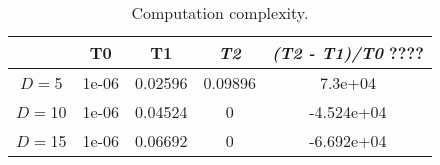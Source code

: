 \begin{table}[ht]
\centering
\caption{ Computation complexity. }
\label{tab:AlgComp}
\begin{tabular}{ccccc}
\hline
  & T0 & T1 & {\it T2} & {\it (T2 - T1)/T0} ???? \\
\hline
$D=$5 & 1e-06 & 0.02596 & 0.09896 & 7.3e+04 \\
$D=$10 & 1e-06 & 0.04524 & 0 & -4.524e+04 \\
$D=$15 & 1e-06 & 0.06692 & 0 & -6.692e+04 \\
\hline
\hline
\end{tabular}
\end{table}
